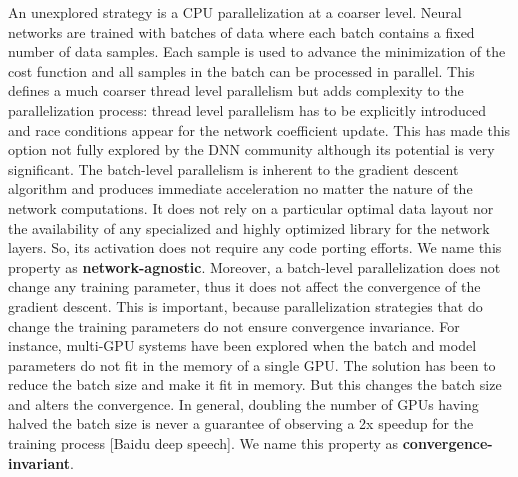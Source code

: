 An unexplored strategy is a CPU parallelization at a coarser level.
Neural networks are trained with batches of data where each batch
contains a fixed number of data samples. Each sample is used to
advance the minimization of the cost function and all samples in
the batch can be processed in parallel. This defines a much coarser
thread level parallelism but adds complexity to the
parallelization process: thread level parallelism has to be explicitly 
introduced and race conditions appear for the network coefficient 
update. This has made this option not fully explored by the
DNN community although its potential is very significant. 
The batch-level parallelism is inherent to the gradient descent 
algorithm and produces immediate acceleration no matter the 
nature of the network computations. It does not rely on a 
particular optimal data layout nor the availability of any specialized 
and highly optimized library for the network layers. So, its 
activation does not require 
any code porting efforts. We name this property as \textbf{network-agnostic}.
Moreover, a batch-level parallelization does not change any 
training parameter, thus it does not affect the convergence of the 
gradient descent. This is important, because parallelization strategies 
that do change the training parameters do not ensure convergence
invariance. For instance, multi-GPU systems have been explored when 
the batch and model parameters do not fit in the memory of a single GPU.
The solution has been to reduce the batch size and make it fit in memory.
But this changes the batch size and alters the convergence. In general, 
doubling the number of GPUs having halved the batch size is never a 
guarantee of observing a 2x speedup for the training 
process [Baidu deep speech]. We name this property as \textbf{convergence-invariant}.


